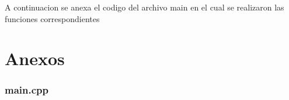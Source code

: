 \newpage
A continuacion se anexa el codigo del archivo main en el cual se realizaron las funciones correspondientes
\section{Anexos}
\subsubsection{main.cpp}
